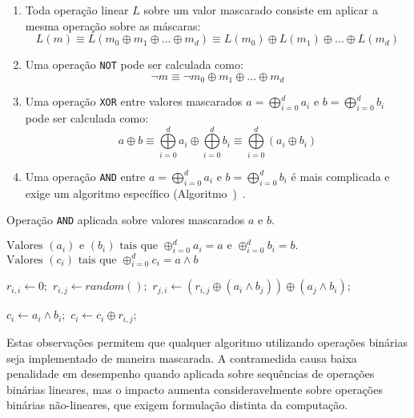 \begin{enumerate}
        \item Toda operação linear $L$ sobre um valor mascarado consiste em aplicar a mesma operação sobre as máscaras:
        $$L(m) \equiv L(m_0 \oplus m_1 \oplus \ldots \oplus m_d) \equiv L(m_0)  \oplus L(m_1) \oplus \ldots \oplus L(m_d)$$
        \item Uma operação \texttt{NOT} pode ser calculada como:
        $$\neg m \equiv \neg m_0 \oplus m_1 \oplus \ldots \oplus m_d$$
        \item Uma operação \texttt{XOR} entre valores mascarados $a =  \bigoplus\limits_{i=0}^{d}a_i$ e $b =  \bigoplus\limits_{i=0}^{d}b_i$ pode ser calculada como:
        $$ a \oplus b \equiv \bigoplus\limits_{i=0}^{d}a_i \oplus \bigoplus\limits_{i=0}^{d}b_i \equiv \bigoplus\limits_{i=0}^{d}(a_i \oplus b_i)$$
        \item Uma operação \texttt{AND} entre $a =  \bigoplus\limits_{i=0}^{d}a_i$ e $b =  \bigoplus\limits_{i=0}^{d}b_i$ é mais complicada e exige um algoritmo específico (Algoritmo~\label{alg:and})~\cite{IshaiSW03}.
\end{enumerate}

\begin{algorithm}[H]
\caption{Operação \texttt{AND} aplicada sobre valores mascarados $a$ e $b$.}\label{alg:and}
\begin{algorithmic}[1]
        \REQUIRE $\text{Valores }(a_i) \text{ e } (b_i) \text{ tais que } \oplus_{i=0}^da_i = a  \text{ e }  \oplus_{i=0}^db_i = b \text{.} $
        \ENSURE $\text{Valores }(c_i) \text{ tais que } \oplus_{i=0}^dc_i = a \wedge b$
        
                \STATE  $r_{i,i}\gets 0;$
                        \STATE $r_{i,j}\gets random( );$
                        \STATE $r_{j,i}\gets (r_{i,j} \oplus (a_i \wedge b_j)) \oplus (a_j \wedge b_i); $
                \ENDFOR
        \ENDFOR
        
                \STATE  $c_i \gets a_i \wedge b_i;$
                        \STATE $c_i \gets c_i \oplus r_{i,j};$
                \ENDFOR
        \ENDFOR
\end{algorithmic}
\end{algorithm}

Estas observações permitem que qualquer algoritmo utilizando operações binárias seja implementado de maneira mascarada.
A contramedida causa baixa penalidade em desempenho quando aplicada sobre sequências de operações binárias lineares, mas o impacto aumenta consideravelmente sobre operações binárias não-lineares, que exigem formulação distinta da computação.

